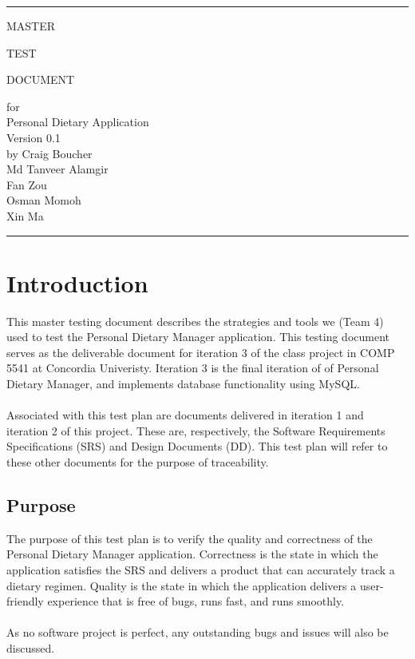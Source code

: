 \documentclass[table]{scrreprt}
\date{}
\def\myversion{0.1}
\begin{document}
    \begin{titlepage}
        \flushright\bfseries\huge
        \rule{\linewidth}{5pt}
        \par
        \vspace{1cm}
        {\Huge MASTER \par TEST \par DOCUMENT \par}
        \vspace{2cm}
        for \\
        \vspace{2cm}
        Personal Dietary Application \\
        \vspace{2cm}
        \LARGE{Version \myversion \\}
        \vspace{2cm}
        by Craig Boucher \\
        Md Tanveer Alamgir \\
        Fan Zou\\
        Osman Momoh \\
        Xin Ma
        \vspace{2cm}
        \rule{\linewidth}{5pt}
    \end{titlepage}

    \tableofcontents

    \chapter{Introduction}
    This master testing document describes the strategies and tools we (Team 4) used to test the Personal Dietary Manager application. This testing document serves as the deliverable document for iteration 3 of the class project in COMP 5541 at Concordia Univeristy. Iteration 3 is the final iteration of of Personal Dietary Manager, and implements database functionality using MySQL. \\ \\
    Associated with this test plan are documents delivered in iteration 1 and iteration 2 of this project. These are, respectively, the Software Requirements Specifications (SRS) and Design Documents (DD). This test plan will refer to these other documents for the purpose of traceability.

    \section{Purpose}
    The purpose of this test plan is to verify the quality and correctness of the Personal Dietary Manager application. Correctness is the state in which the application satisfies the SRS and delivers a product that can accurately track a dietary regimen. Quality is the state in which the application delivers a user-friendly experience that is free of bugs, runs fast, and runs smoothly. \\\\
    As no software project is perfect, any outstanding bugs and issues will also be discussed.
\end{document}
